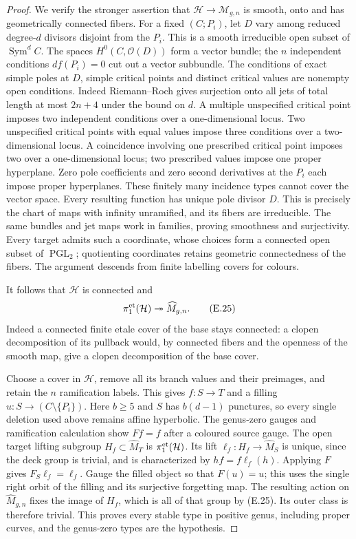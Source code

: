 \begin{proof}
We verify the stronger assertion that
$\mathcal H\to\mathcal M_{g,n}$ is smooth, onto and has
geometrically connected fibers.  For a fixed $(C;P_i)$, let
$D$ vary among reduced degree-$d$ divisors disjoint from the
$P_i$.  This is a smooth irreducible open subset of
$\operatorname{Sym}^d C$.  The spaces $H^0(C,\mathcal O(D))$
form a vector bundle; the $n$ independent conditions
$df(P_i)=0$ cut out a vector subbundle.
The conditions of exact simple poles at $D$, simple critical
points and distinct critical values are nonempty open
conditions.  Indeed Riemann--Roch gives surjection onto all
jets of total length at most $2n+4$ under the bound on $d$.
A multiple unspecified critical point imposes two independent
conditions over a one-dimensional locus.  Two unspecified
critical points with equal values impose three conditions
over a two-dimensional locus.  A coincidence involving one
prescribed critical point imposes two over a one-dimensional
locus; two prescribed values impose one proper hyperplane.
Zero pole coefficients and zero second derivatives at the
$P_i$ each impose proper hyperplanes.  These finitely many
incidence types cannot cover the vector space.
Every resulting function has unique pole divisor $D$.
This is precisely the chart of maps with infinity unramified,
and its fibers are irreducible.  The same bundles and jet
maps work in families, proving smoothness and surjectivity.
Every target admits such a coordinate, whose choices form a
connected open subset of $\operatorname{PGL}_2$; quotienting
coordinates retains geometric connectedness of the fibers.
The argument descends from finite labelling covers for colours.

It follows that $\mathcal H$ is connected and
\[
             \pi_1^{\rm et}(\mathcal H)\twoheadrightarrow
                          \widehat M_{g,n}.               \tag{E.25}
\]
Indeed a connected finite etale cover of the base stays
connected: a clopen decomposition of its pullback would,
by connected fibers and the openness of the smooth map,
give a clopen decomposition of the base cover.

Choose a cover in $\mathcal H$, remove all its branch values
and their preimages, and retain the $n$ ramification labels.
This gives $f:S\to T$ and a filling $u:S\to(C\setminus\{P_i\})$.
Here $b\geq5$ and $S$ has $b(d-1)$ punctures, so every
single deletion used above remains affine hyperbolic.
The genus-zero gauges and ramification calculation show
$Ff=f$ after a coloured source gauge.  The open target
lifting subgroup $H_f\subset\widehat M_T$ is
$\pi_1^{\rm et}(\mathcal H)$.  Its lift
$\ell_f:H_f\to\widehat M_S$ is unique, since the deck group
is trivial, and is characterized by $hf=f\ell_f(h)$.
Applying $F$ gives $F_S\ell_f=\ell_f$.
Gauge the filled object so that $F(u)=u$; this uses the single
right orbit of the filling and its surjective forgetting map.
The resulting action on $\widehat M_{g,n}$ fixes the image
of $H_f$, which is all of that group by (E.25).
Its outer class is therefore trivial.  This proves every
stable type in positive genus, including proper curves, and
the genus-zero types are the hypothesis.
\end{proof}

